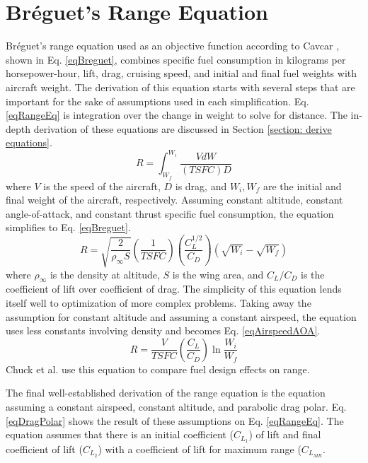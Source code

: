 \section{Br\'eguet's Range Equation}
\hspace{.5cm} Br\'eguet's range equation used as an objective function according to Cavcar \cite{breguetRangeEqn}, shown in Eq. \ref{eqBreguet}, combines specific fuel consumption in kilograms per horsepower-hour, lift, drag, cruising speed, and initial and final fuel weights with aircraft weight. The derivation of this equation starts with several steps that are important for the sake of assumptions used in each simplification. Eq. \ref{eqRangeEq} is integration over the change in weight to solve for distance. The in-depth derivation of these equations are discussed in Section \ref{section: derive equations}.
\begin{equation}
    R = \int_{W_f}^{W_i}\dfrac{VdW}{(TSFC)D}
    \label{eqRangeEq}
\end{equation}
where $V$ is the speed of the aircraft, $D$ is drag, and $W_i,W_f$ are the initial and final weight of the aircraft, respectively. Assuming constant altitude, constant angle-of-attack, and constant thrust specific fuel consumption, the equation simplifies to Eq. \ref{eqBreguet}.
\begin{equation}
\label{eqBreguet}
R = \sqrt{\dfrac{2}{\rho_\infty S}}\left(\dfrac{1}{TSFC}\right) \left(\dfrac{C_L^{1/2}}{C_D}\right)(\sqrt{W_i}-\sqrt{W_f})
\end{equation}
where $\rho_\infty$ is the density at altitude, $S$ is the wing area, and $C_L/C_D$ is the coefficient of lift over coefficient of drag. The simplicity of this equation lends itself well to optimization of more complex problems. Taking away the assumption for constant altitude and assuming a constant airspeed, the equation uses less constants involving density and becomes Eq. \ref{eqAirspeedAOA}.
\begin{equation}
\label{eqAirspeedAOA}
    R = \dfrac{V}{TSFC}\left(\dfrac{C_L}{C_D}\right)\ln\dfrac{W_i}{W_f}
\end{equation}
Chuck et al. \cite{fuelsLOGRange} use this equation to compare fuel design effects on range. \par
The final well-established derivation of the range equation is the equation assuming a constant airspeed, constant altitude, and parabolic drag polar. Eq. \ref{eqDragPolar} shows the result of these assumptions on Eq. \ref{eqRangeEq}. The equation assumes that there is an initial coefficient ($C_{L_1}$) of lift and final coefficient of lift ($C_{L_2}$) with a coefficient of lift for maximum range ($C_{L_{MR}}$.
